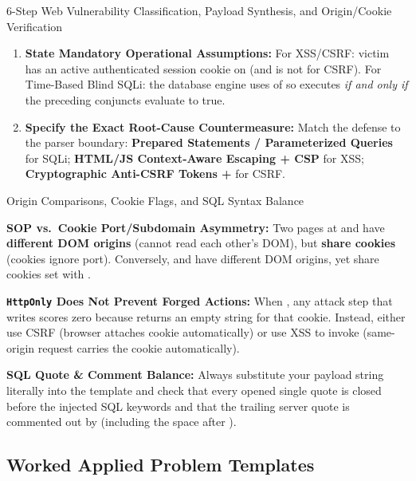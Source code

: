 \begin{schemebox}{6-Step Web Vulnerability Classification, Payload Synthesis, and Origin/Cookie Verification}
\begin{enumerate}[label=\textbf{Step \arabic*:}, leftmargin=3.8em]
  \item \textbf{State Mandatory Operational Assumptions:}
  For XSS/CSRF: victim has an active authenticated session cookie on  (and  is not  for CSRF). For Time-Based Blind SQLi: the database engine uses  of  so  executes \emph{if and only if} the preceding conjuncts evaluate to true.

  \item \textbf{Specify the Exact Root-Cause Countermeasure:}
  Match the defense to the parser boundary: \textbf{Prepared Statements / Parameterized Queries} for SQLi; \textbf{HTML/JS Context-Aware Escaping + CSP} for XSS; \textbf{Cryptographic Anti-CSRF Tokens + } for CSRF.
\end{enumerate}
\end{schemebox}

\begin{verifybox}{Origin Comparisons, Cookie Flags, and SQL Syntax Balance}
\begin{compactitem}
  \item \textbf{SOP vs.\ Cookie Port/Subdomain Asymmetry:} Two pages at  and  have \textbf{different DOM origins} (cannot read each other's DOM), but \textbf{share cookies} (cookies ignore port). Conversely,  and  have different DOM origins, yet share cookies set with .
  \item \textbf{\texttt{HttpOnly} Does Not Prevent Forged Actions:} When , any attack step that writes  scores zero because  returns an empty string for that cookie. Instead, either use CSRF (browser attaches cookie automatically) or use XSS to invoke  (same-origin request carries the  cookie automatically).
  \item \textbf{SQL Quote \& Comment Balance:} Always substitute your payload string literally into the template  and check that every opened single quote  is closed before the injected SQL keywords and that the trailing server quote  is commented out by \code{-- } (including the space after \code{--}).
\end{compactitem}
\end{verifybox}

\subsection{Worked Applied Problem Templates}

